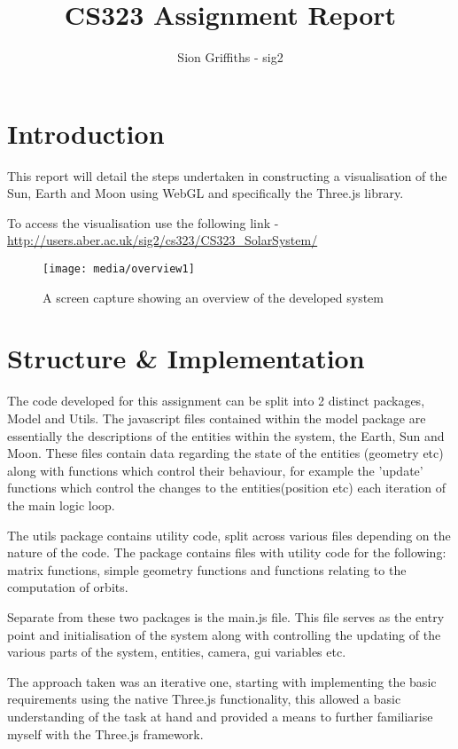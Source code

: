 \documentclass[titlepage]{article}
\title{CS323 Assignment Report}
\author{Sion Griffiths - sig2}
\begin{document}
\maketitle
\tableofcontents




\newpage
\section{Introduction}

This report will detail the steps undertaken in constructing a visualisation of the Sun, Earth and Moon using WebGL and specifically the Three.js library.

To access the visualisation use the following link -  \url{http://users.aber.ac.uk/sig2/cs323/CS323\_SolarSystem/}


\begin{figure}[h!]
                \centering
                \texttt{[image: media/overview1]}
                \caption{A screen capture showing an overview of the developed system}
                \label{fig:basic_model}
            \end{figure}


\section{Structure \& Implementation}
The code developed for this assignment can be split into 2 distinct packages, Model and Utils. The javascript files contained within the model package are essentially the descriptions of the entities within the system, the Earth, Sun and Moon. These files contain data regarding the state of the entities (geometry etc) along with functions which control their behaviour, for example the 'update' functions which control the changes to the entities(position etc) each iteration of the main logic loop.


The utils package contains utility code, split across various files depending on the nature of the code. The package contains files with utility code for the following: matrix functions, simple geometry functions and functions relating to the computation of orbits.


Separate from these two packages is the main.js file. This file serves as the entry point and initialisation of the system along with controlling the updating of the various parts of the system, entities, camera, gui variables etc. 


The approach taken was an iterative one, starting with implementing the basic requirements using the native Three.js functionality, this allowed a basic understanding of the task at hand and provided a means to further familiarise myself with the Three.js framework.
\end{document}
